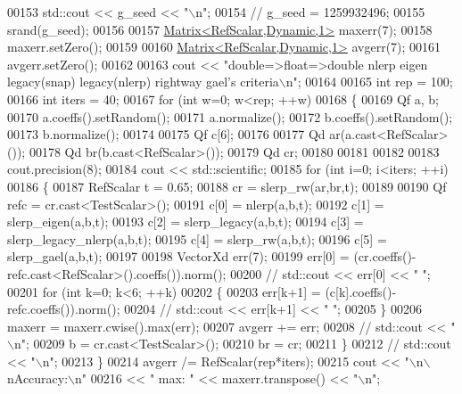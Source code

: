 \begin{DoxyCode}
00153   std::cout << g\_seed << \textcolor{stringliteral}{"\(\backslash\)n"};
00154 \textcolor{comment}{//   g\_seed = 1259932496;}
00155   srand(g\_seed);
00156   
00157   \hyperlink{group___core___module_class_eigen_1_1_matrix}{Matrix<RefScalar,Dynamic,1>} maxerr(7);
00158   maxerr.setZero();
00159   
00160   \hyperlink{group___core___module_class_eigen_1_1_matrix}{Matrix<RefScalar,Dynamic,1>} avgerr(7);
00161   avgerr.setZero();
00162   
00163   cout << \textcolor{stringliteral}{"double=>float=>double       nlerp        eigen        legacy(snap)         legacy(nlerp)       
       rightway         gael's criteria\(\backslash\)n"};
00164   
00165   \textcolor{keywordtype}{int} rep = 100;
00166   \textcolor{keywordtype}{int} iters = 40;
00167   \textcolor{keywordflow}{for} (\textcolor{keywordtype}{int} w=0; w<rep; ++w)
00168   \{
00169     Qf a, b;
00170     a.coeffs().setRandom();
00171     a.normalize();
00172     b.coeffs().setRandom();
00173     b.normalize();
00174     
00175     Qf c[6];
00176     
00177     Qd ar(a.cast<RefScalar>());
00178     Qd br(b.cast<RefScalar>());
00179     Qd cr;
00180     
00181     
00182     
00183     cout.precision(8);
00184     cout << std::scientific;
00185     \textcolor{keywordflow}{for} (\textcolor{keywordtype}{int} i=0; i<iters; ++i)
00186     \{
00187       RefScalar t = 0.65;
00188       cr = slerp\_rw(ar,br,t);
00189       
00190       Qf refc = cr.cast<TestScalar>();
00191       c[0] = nlerp(a,b,t);
00192       c[1] = slerp\_eigen(a,b,t);
00193       c[2] = slerp\_legacy(a,b,t);
00194       c[3] = slerp\_legacy\_nlerp(a,b,t);
00195       c[4] = slerp\_rw(a,b,t);
00196       c[5] = slerp\_gael(a,b,t);
00197       
00198       VectorXd err(7);
00199       err[0] = (cr.coeffs()-refc.cast<RefScalar>().coeffs()).norm();
00200 \textcolor{comment}{//       std::cout << err[0] << "    ";}
00201       \textcolor{keywordflow}{for} (\textcolor{keywordtype}{int} k=0; k<6; ++k)
00202       \{
00203         err[k+1] = (c[k].coeffs()-refc.coeffs()).norm();
00204 \textcolor{comment}{//         std::cout << err[k+1] << "    ";}
00205       \}
00206       maxerr = maxerr.cwise().max(err);
00207       avgerr += err;
00208 \textcolor{comment}{//       std::cout << "\(\backslash\)n";}
00209       b = cr.cast<TestScalar>();
00210       br = cr;
00211     \}
00212 \textcolor{comment}{//     std::cout << "\(\backslash\)n";}
00213   \}
00214   avgerr /= RefScalar(rep*iters);
00215   cout << \textcolor{stringliteral}{"\(\backslash\)n\(\backslash\)nAccuracy:\(\backslash\)n"}
00216        << \textcolor{stringliteral}{"  max: "} << maxerr.transpose() << \textcolor{stringliteral}{"\(\backslash\)n"};

\end{DoxyCode}
